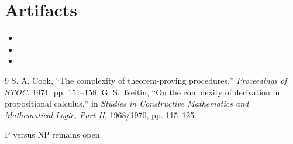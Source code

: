 \documentclass[11pt]{article}
\begin{document}
\section{Artifacts}
\begin{itemize}
\item {}
\item {}
\item {}
\end{itemize}

\begin{thebibliography}{9}
S. A. Cook, ``The complexity of theorem-proving procedures,''
\emph{Proceedings of STOC}, 1971, pp. 151--158.
G. S. Tseitin, ``On the complexity of derivation in propositional calculus,''
in \emph{Studies in Constructive Mathematics and Mathematical Logic, Part II},
1968/1970, pp. 115--125.
\end{thebibliography}

\bigskip
\noindent P versus NP remains open.
\end{document}
